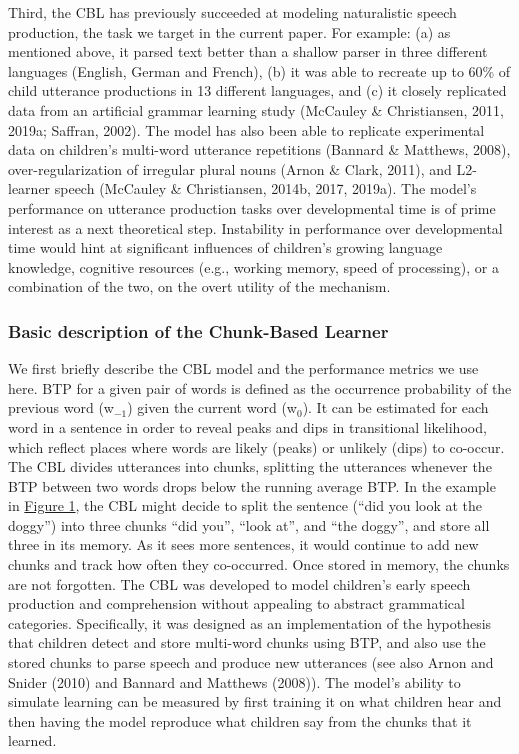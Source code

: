 \documentclass[
  english,
  man,floatsintext]{apa6}
\begin{document}
Third, the CBL has previously succeeded at modeling naturalistic speech production, the task we target in the current paper. For example: (a) as mentioned above, it parsed text better than a shallow parser in three different languages (English, German and French), (b) it was able to recreate up to 60\% of child utterance productions in 13 different languages, and (c) it closely replicated data from an artificial grammar learning study (McCauley \& Christiansen, 2011, 2019a; Saffran, 2002). The model has also been able to replicate experimental data on children's multi-word utterance repetitions (Bannard \& Matthews, 2008), over-regularization of irregular plural nouns (Arnon \& Clark, 2011), and L2-learner speech (McCauley \& Christiansen, 2014b, 2017, 2019a). The model's performance on utterance production tasks over developmental time is of prime interest as a next theoretical step. Instability in performance over developmental time would hint at significant influences of children's growing language knowledge, cognitive resources (e.g., working memory, speed of processing), or a combination of the two, on the overt utility of the mechanism.

\hypertarget{basic-description-of-the-chunk-based-learner}{%
\subsubsection{Basic description of the Chunk-Based Learner}\label{basic-description-of-the-chunk-based-learner}}

We first briefly describe the CBL model and the performance metrics we use here. BTP for a given pair of words is defined as the occurrence probability of the previous word (w\(_{-1}\)) given the current word (w\(_0\)). It can be estimated for each word in a sentence in order to reveal peaks and dips in transitional likelihood, which reflect places where words are likely (peaks) or unlikely (dips) to co-occur. The CBL divides utterances into chunks, splitting the utterances whenever the BTP between two words drops below the running average BTP. In the example in \protect\hyperlink{fig1}{Figure 1}, the CBL might decide to split the sentence (\enquote{did you look at the doggy}) into three chunks \enquote{did you}, \enquote{look at}, and \enquote{the doggy}, and store all three in its memory. As it sees more sentences, it would continue to add new chunks and track how often they co-occurred. Once stored in memory, the chunks are not forgotten. The CBL was developed to model children's early speech production and comprehension without appealing to abstract grammatical categories. Specifically, it was designed as an implementation of the hypothesis that children detect and store multi-word chunks using BTP, and also use the stored chunks to parse speech and produce new utterances (see also Arnon and Snider (2010) and Bannard and Matthews (2008)). The model's ability to simulate learning can be measured by first training it on what children hear and then having the model reproduce what children say from the chunks that it learned.
\end{document}

